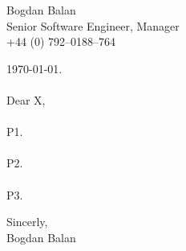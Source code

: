 \documentclass[oneside,10pt]{memoir}
\begin{document}
\noindent
Bogdan Balan \\
Senior Software Engineer, Manager \\
+44 (0) 792--0188--764 \\

\begin{vplace}[0.77]
\noindent
\today.\\
\\
Dear X, \\
\\
P1.\\
\\
P2.\\
\\
P3.\\
\end{vplace}

\noindent
Sincerly,\\
Bogdan Balan
\end{document}
